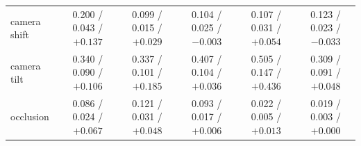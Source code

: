 \documentclass{article}
\begin{document}
\begin{table}[t]
{\begin{tabular}{lccccc}
camera shift & 0.200 / 0.043 / $+0.137$ & 0.099 / 0.015 / $+0.029$ & 0.104 / 0.025 / $-0.003$ & 0.107 / 0.031 / $+0.054$ & 0.123 / 0.023 / $-0.033$ \\
camera tilt & 0.340 / 0.090 / $+0.106$ & 0.337 / 0.101 / $+0.185$ & 0.407 / 0.104 / $+0.036$ & 0.505 / 0.147 / $+0.436$ & 0.309 / 0.091 / $+0.048$ \\
occlusion & 0.086 / 0.024 / $+0.067$ & 0.121 / 0.031 / $+0.048$ & 0.093 / 0.017 / $+0.006$ & 0.022 / 0.005 / $+0.013$ & 0.019 / 0.003 / $+0.000$ \\
\bottomrule
\end{tabular}}
\end{table}

\begin{table}[t]\centering\small
\caption{Reacher, camera tilt: where unsafe plans get vetoed. 200 safe starts near the box $\times$ 64 random CEM-style 5-block plans, labels from simulating each plan; veto = $h<0$ on the start frame or any predicted block (CCEM's rule, threshold 0). MLP $h$ except the last two columns. Script \texttt{reacher\_eval\_logs/veto\_tilt\_perstep.py} (\texttt{reacher\_veto\_diag.py} + per-step output), log \texttt{reacher\_eval\_logs/veto\_tilt\_perstep.log} (2026-11-11). One world-model seed.}
\label{tab:tilt_perstep}
\end{table}
\end{document}

